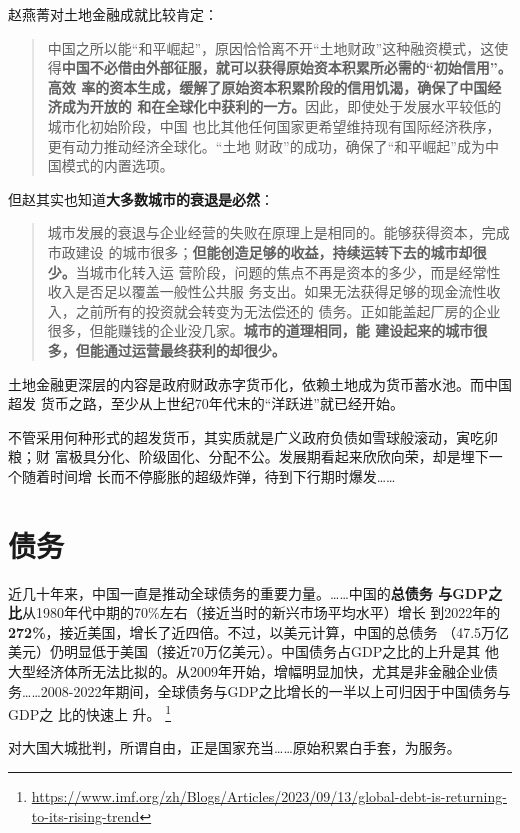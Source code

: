 赵燕菁对土地金融成就比较肯定：
\begin{quotation}
  中国之所以能“和平崛起”，原因恰恰离不开“土地财政”这种融资模式，这使
  得\textbf{中国不必借由外部征服，就可以获得原始资本积累所必需的“初始信用”。高效
    率的资本生成，缓解了原始资本积累阶段的信用饥渴，确保了中国经济成为开放的
    和在全球化中获利的一方。}因此，即使处于发展水平较低的城市化初始阶段，中国
  也比其他任何国家更希望维持现有国际经济秩序，更有动力推动经济全球化。“土地
  财政”的成功，确保了“和平崛起”成为中国模式的内置选项。
\end{quotation}

但赵其实也知道\textbf{大多数城市的衰退是必然}：
\begin{quotation}
  城市发展的衰退与企业经营的失败在原理上是相同的。能够获得资本，完成市政建设
  的城市很多；\textbf{但能创造足够的收益，持续运转下去的城市却很少。}当城市化转入运
  营阶段，问题的焦点不再是资本的多少，而是经常性收入是否足以覆盖一般性公共服
  务支出。如果无法获得足够的现金流性收入，之前所有的投资就会转变为无法偿还的
  债务。正如能盖起厂房的企业很多，但能赚钱的企业没几家。\textbf{城市的道理相同，能
    建设起来的城市很多，但能通过运营最终获利的却很少。}
\end{quotation}

土地金融更深层的内容是政府财政赤字货币化，依赖土地成为货币蓄水池。而中国超发
货币之路，至少从上世纪70年代末的“洋跃进”就已经开始。

不管采用何种形式的超发货币，其实质就是广义政府负债如雪球般滚动，寅吃卯粮；财
富极具分化、阶级固化、分配不公。发展期看起来欣欣向荣，却是埋下一个随着时间增
长而不停膨胀的超级炸弹，待到下行期时爆发……


\section{债务}



近几十年来，中国一直是推动全球债务的重要力量。……中国的\textbf{总债务
  与GDP之比}从1980年代中期的70\%左右（接近当时的新兴市场平均水平）增长
到2022年的\textbf{272\%}，接近美国，增长了近四倍。不过，以美元计算，中国的总债务
（47.5万亿美元）仍明显低于美国（接近70万亿美元）。中国债务占GDP之比的上升是其
他大型经济体所无法比拟的。从2009年开始，增幅明显加快，尤其是非金融企业债
务……2008-2022年期间，全球债务与GDP之比增长的一半以上可归因于中国债务与GDP之
比的快速上
升。
\footnote{\url{https://www.imf.org/zh/Blogs/Articles/2023/09/13/global-debt-is-returning-to-its-rising-trend}}


对大国大城批判，所谓自由，正是国家充当……原始积累白手套，为服务。




